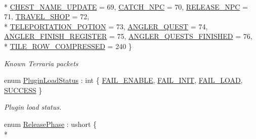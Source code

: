 \begin{DoxyCompactItemize}
\\*
\hyperlink{namespaceOTA_a171602badf7b6889d328488937bafa63a666429a97ea4e7f0b08c7853be6ece7b}{C\+H\+E\+S\+T\+\_\+\+N\+A\+M\+E\+\_\+\+U\+P\+D\+A\+T\+E} = 69, 
\hyperlink{namespaceOTA_a171602badf7b6889d328488937bafa63a122c5bcba5d98f076a82abd1c455ef31}{C\+A\+T\+C\+H\+\_\+\+N\+P\+C} = 70, 
\hyperlink{namespaceOTA_a171602badf7b6889d328488937bafa63a9da613d3aa75f4a173c0b02705cf6d1a}{R\+E\+L\+E\+A\+S\+E\+\_\+\+N\+P\+C} = 71, 
\hyperlink{namespaceOTA_a171602badf7b6889d328488937bafa63a3de2405ae138ca089e622517793d31ff}{T\+R\+A\+V\+E\+L\+\_\+\+S\+H\+O\+P} = 72, 
\\*
\hyperlink{namespaceOTA_a171602badf7b6889d328488937bafa63a9635779ca7358c5ad2d19334ef375684}{T\+E\+L\+E\+P\+O\+R\+T\+A\+T\+I\+O\+N\+\_\+\+P\+O\+T\+I\+O\+N} = 73, 
\hyperlink{namespaceOTA_a171602badf7b6889d328488937bafa63a00e4e9f672e8b9bad54b2cbedd89c17c}{A\+N\+G\+L\+E\+R\+\_\+\+Q\+U\+E\+S\+T} = 74, 
\hyperlink{namespaceOTA_a171602badf7b6889d328488937bafa63a20b2812674fed245fd0fadf16b432bff}{A\+N\+G\+L\+E\+R\+\_\+\+F\+I\+N\+I\+S\+H\+\_\+\+R\+E\+G\+I\+S\+T\+E\+R} = 75, 
\hyperlink{namespaceOTA_a171602badf7b6889d328488937bafa63a0480892ef8a0ff4ea6e85f9a33cce4bb}{A\+N\+G\+L\+E\+R\+\_\+\+Q\+U\+E\+S\+T\+S\+\_\+\+F\+I\+N\+I\+S\+H\+E\+D} = 76, 
\\*
\hyperlink{namespaceOTA_a171602badf7b6889d328488937bafa63af9115059deee79fe5b52bae24bb22e63}{T\+I\+L\+E\+\_\+\+R\+O\+W\+\_\+\+C\+O\+M\+P\+R\+E\+S\+S\+E\+D} = 240
 \}\begin{DoxyCompactList}\small\item\em Known Terraria packets \end{DoxyCompactList}
\item 
enum \hyperlink{namespaceOTA_a6a85498d6b4013ed2e9221168ed1d999}{Plugin\+Load\+Status} \+: int \{ \hyperlink{namespaceOTA_a6a85498d6b4013ed2e9221168ed1d999ac6cc3be9d2dc2d5d88b8a967a1610435}{F\+A\+I\+L\+\_\+\+E\+N\+A\+B\+L\+E}, 
\hyperlink{namespaceOTA_a6a85498d6b4013ed2e9221168ed1d999ab17ce2ee2def0547f2ac56c522835d14}{F\+A\+I\+L\+\_\+\+I\+N\+I\+T}, 
\hyperlink{namespaceOTA_a6a85498d6b4013ed2e9221168ed1d999a9bda17ceeddc5ef072f8d78aeb769d56}{F\+A\+I\+L\+\_\+\+L\+O\+A\+D}, 
\hyperlink{namespaceOTA_a6a85498d6b4013ed2e9221168ed1d999ad0749aaba8b833466dfcbb0428e4f89c}{S\+U\+C\+C\+E\+S\+S}
 \}\begin{DoxyCompactList}\small\item\em Plugin load status. \end{DoxyCompactList}
\item 
enum \hyperlink{namespaceOTA_a7e114a895c876876b92a8a256350f287}{Release\+Phase} \+: ushort \{ \\*

\end{DoxyCompactItemize}
